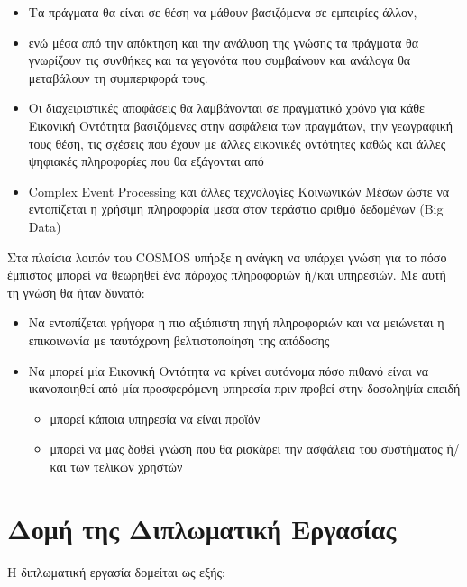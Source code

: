 \begin{itemize}
\item
Τα πράγματα θα είναι σε θέση να μάθουν βασιζόμενα σε εμπειρίες άλλον,
\item
 ενώ μέσα από την απόκτηση και την ανάλυση της γνώσης τα πράγματα θα γνωρίζουν τις συνθήκες και τα γεγονότα που συμβαίνουν και ανάλογα θα μεταβάλουν τη συμπεριφορά τους.
\item Οι διαχειριστικές αποφάσεις θα λαμβάνονται σε πραγματικό χρόνο για κάθε Εικονική Οντότητα βασιζόμενες στην ασφάλεια των πραγμάτων, την γεωγραφική τους θέση, τις σχέσεις που έχουν με άλλες εικονικές οντότητες καθώς και άλλες ψηφιακές πληροφορίες που θα εξάγονται από
\item Complex Event Processing και άλλες τεχνολογίες Κοινωνικών Mέσων ώστε να εντοπίζεται η χρήσιμη πληροφορία μεσα στον τεράστιο αριθμό δεδομένων (Big Data)
\end{itemize}
\newpage

Στα πλαίσια λοιπόν του COSMOS  υπήρξε η ανάγκη να υπάρχει γνώση για το πόσο έμπιστος μπορεί να θεωρηθεί ένα πάροχος πληροφοριών ή/και υπηρεσιών. Με αυτή τη γνώση θα ήταν δυνατό: 
\begin{itemize}
	 \item Να εντοπίζεται γρήγορα η πιο αξιόπιστη πηγή πληροφοριών και να μειώνεται η επικοινωνία με ταυτόχρονη βελτιστοποίηση της απόδοσης
	 
 	 \item Να μπορεί μία Εικονική Οντότητα να κρίνει αυτόνομα πόσο πιθανό είναι να ικανοποιηθεί από μία προσφερόμενη υπηρεσία πριν προβεί στην δοσοληψία επειδή
 	 \begin{itemize}
 	 	\item μπορεί κάποια υπηρεσία να είναι προϊόν
 	 	\item μπορεί να μας δοθεί γνώση που θα ρισκάρει την ασφάλεια του συστήματος ή/και των τελικών χρηστών
 	 	\end{itemize}
\end{itemize}
 

\section{Δομή της Διπλωματική Εργασίας} 
Η διπλωματική εργασία δομείται ως εξής:

